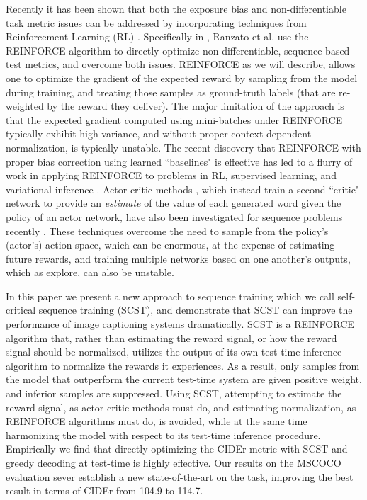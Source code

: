 \documentclass[10pt,twocolumn,letterpaper]{article}
\begin{document}
Recently it has been shown that both the exposure bias and non-differentiable task metric issues can be addressed by incorporating techniques from Reinforcement Learning (RL) \cite{Sutton:1998}. Specifically in \cite{Ranzato}, Ranzato et al. use the REINFORCE algorithm \cite{Reinforce} to directly optimize non-differentiable, sequence-based test metrics, and overcome both issues. 
REINFORCE as we will describe, allows one to optimize the gradient of the expected reward by sampling from the model during training, and treating those samples as ground-truth labels (that are re-weighted by the reward they deliver). The major limitation of the approach is that the expected gradient computed using mini-batches under REINFORCE typically exhibit high variance, and without proper context-dependent normalization, is typically unstable. The recent discovery that REINFORCE  with proper bias correction using learned ``baselines" is effective has led to a flurry of work in applying REINFORCE to problems in RL, supervised learning, and variational inference \cite{schulman2015high, ZarembaS15, mnih2014neural}. Actor-critic methods \cite{Sutton:1998} , which instead train a second ``critic" network to provide an \emph{estimate} of the value of each generated word given the policy of an actor network, have also been investigated for sequence problems recently  \cite{actorCriticSequence}. These techniques overcome the need to sample from the policy's (actor's) action space, which can be enormous, at the expense of estimating future rewards, and training multiple networks based on one another's outputs, which as \cite{actorCriticSequence} explore, can also be unstable.

In this paper we present a new approach to sequence training which we call self-critical sequence training (SCST), and demonstrate that SCST can improve the performance of image captioning systems dramatically. SCST is a REINFORCE algorithm that, rather than estimating the reward signal, or how the reward signal should be normalized, utilizes the output of its own test-time inference algorithm to normalize the rewards it experiences. As a result, only samples from the model that outperform the current test-time system are given positive weight, and inferior samples are suppressed. Using SCST, attempting to estimate the reward signal, as actor-critic methods must do, and estimating normalization, as REINFORCE algorithms must do, is avoided, while at the same time harmonizing the model with respect to its test-time inference procedure. Empirically we find that directly optimizing the CIDEr metric with SCST and greedy decoding at test-time is highly effective. Our results on the MSCOCO evaluation sever establish a new state-of-the-art on the task, improving the best result in terms of CIDEr from 104.9 to 114.7.
\end{document}
